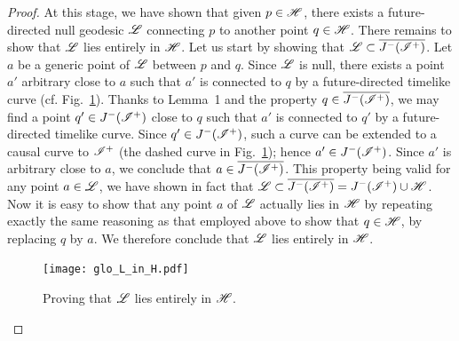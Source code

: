 \begin{proof}
At this stage, we have shown that given $p\in\mathscr{H}$, there exists
a future-directed null geodesic $\mathscr{L}$ connecting $p$ to another point $q\in\mathscr{H}$.
There remains to show that $\mathscr{L}$ lies entirely in $\mathscr{H}$.
Let us start by showing that $\mathscr{L}\subset \overline{J^-(\mathscr{I}^+)}$.
Let $a$ be a generic point of $\mathscr{L}$ between $p$ and $q$. Since $\mathscr{L}$ is
null, there exists a point
$a'$ arbitrary close to $a$ such that $a'$ is connected to $q$ by a
future-directed timelike curve (cf. Fig.~\ref{f:glo:L_in_H}). Thanks to Lemma~1
and the property $q\in \overline{J^-(\mathscr{I}^+)}$, we may
find a point $q'\in J^-(\mathscr{I}^+)$ close to $q$ such that $a'$ is connected
to $q'$ by a future-directed timelike curve.
Since $q'\in J^-(\mathscr{I}^+)$, such a curve can be extended
to a causal curve to $\mathscr{I}^+$  (the dashed curve
in Fig.~\ref{f:glo:L_in_H}); hence
$a'\in  J^-(\mathscr{I}^+)$. Since $a'$ is arbitrary close to $a$, we conclude
that $a\in\overline{J^-(\mathscr{I}^+)}$.
This property being valid for any point $a\in \mathscr{L}$, we have
shown in fact that $\mathscr{L}\subset \overline{J^-(\mathscr{I}^+)} = J^-(\mathscr{I}^+)\cup \mathscr{H}$.
Now it is easy to show that any point $a$ of $\mathscr{L}$ actually lies in $\mathscr{H}$
by repeating exactly the same reasoning as that employed above to show that
$q\in\mathscr{H}$, by replacing $q$ by $a$. We therefore conclude that
$\mathscr{L}$ lies entirely in $\mathscr{H}$.

\begin{figure}
\centerline{\texttt{[image: glo\_L\_in\_H.pdf]}}
\caption[]{\label{f:glo:L_in_H} \footnotesize
Proving that $\mathscr{L}$ lies entirely in $\mathscr{H}$.}
\end{figure}




\end{proof}

